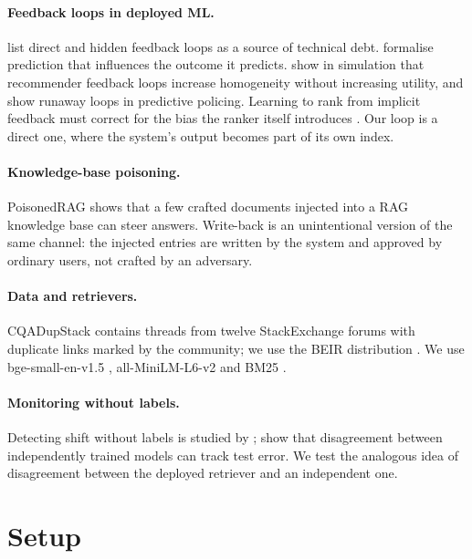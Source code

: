 \documentclass[11pt]{article}
\begin{document}
\paragraph{Feedback loops in deployed ML.} \citet{sculley2015debt} list direct and hidden feedback loops as a source of technical debt. \citet{perdomo2020performative} formalise prediction that influences the outcome it predicts. \citet{chaney2018confounding} show in simulation that recommender feedback loops increase homogeneity without increasing utility, and \citet{ensign2018runaway} show runaway loops in predictive policing. Learning to rank from implicit feedback must correct for the bias the ranker itself introduces \citep{joachims2017unbiased}. Our loop is a direct one, where the system's output becomes part of its own index.

\paragraph{Knowledge-base poisoning.} PoisonedRAG \citep{zou2025poisonedrag} shows that a few crafted documents injected into a RAG knowledge base can steer answers. Write-back is an unintentional version of the same channel: the injected entries are written by the system and approved by ordinary users, not crafted by an adversary.

\paragraph{Data and retrievers.} CQADupStack \citep{hoogeveen2015cqadupstack} contains threads from twelve StackExchange forums with duplicate links marked by the community; we use the BEIR distribution \citep{thakur2021beir}. We use bge-small-en-v1.5 \citep{xiao2024cpack}, all-MiniLM-L6-v2 \citep{reimers2019sbert,wang2020minilm} and BM25 \citep{robertson2009bm25}.

\paragraph{Monitoring without labels.} Detecting shift without labels is studied by \citet{rabanser2019failing}; \citet{jiang2022disagreement} show that disagreement between independently trained models can track test error. We test the analogous idea of disagreement between the deployed retriever and an independent one.

\section{Setup}
\label{sec:setup}
\end{document}
